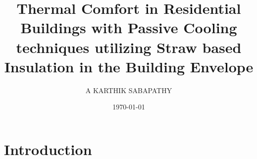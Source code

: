 \documentclass[12pt]{report}
\begin{document}
\title{Thermal Comfort in Residential Buildings with Passive Cooling techniques utilizing Straw based Insulation in the Building Envelope}
\author{A KARTHIK SABAPATHY}
\date{\today}

\maketitle


\chapter{Introduction}
\end{document}
